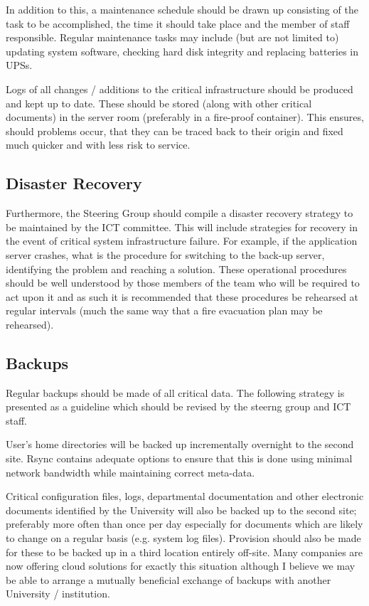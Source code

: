 \documentclass[a4paper, twoside]{article}
\begin{document}
In addition to this, a maintenance schedule should be drawn up consisting of the
task to be accomplished, the time it should take place and the member of staff
responsible. Regular maintenance tasks may include (but are not limited to)
updating system software, checking hard disk integrity and replacing batteries
in UPSs.

Logs of all changes / additions to the critical infrastructure should be produced
and kept up to date. These should be stored (along with other critical
documents) in the server room (preferably in a fire-proof container). This
ensures, should problems occur, that they can be traced back to their origin and
fixed much quicker and with less risk to service.

\subsection{Disaster Recovery}
Furthermore, the Steering Group should compile a disaster recovery strategy to
be maintained by the ICT committee. This will include strategies for recovery in
the event of critical system infrastructure failure. For example, if the
application server crashes, what is the procedure for switching to the back-up
server, identifying the problem and reaching a solution. These operational
procedures should be well understood by those members of the team who will be
required to act upon it and as such it is recommended that these procedures be
rehearsed at regular intervals (much the same way that a fire evacuation plan
may be rehearsed).

\subsection{Backups}
Regular backups should be made of all critical data. The following strategy is
presented as a guideline which should be revised by the steerng group and ICT
staff.

User's home directories will be backed up incrementally overnight to the second
site. Rsync contains adequate options to ensure that this is done using minimal
network bandwidth while maintaining correct meta-data.

Critical configuration files, logs, departmental documentation and other
electronic documents identified by the University will also be backed up to the
second site; preferably more often than once per day especially for documents
which are likely to change on a regular basis (e.g. system log files). Provision
should also be made for these to be backed up in a third location entirely
off-site. Many companies are now offering cloud solutions for exactly this
situation although I believe we may be able to arrange a mutually beneficial
exchange of backups with another University / institution.
\end{document}

